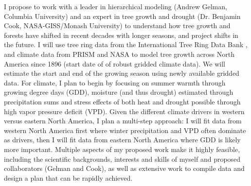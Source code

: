 \documentclass[11pt,letter,oneside]{article}
\begin{document}
I propose to work with a leader in hierarchical modeling (Andrew Gelman, Columbia University) and an expert in tree growth and drought (Dr. Benjamin Cook, NASA-GISS/Monash University) to understand how tree growth and forests have shifted in recent decades with longer seasons, and project shifts in the future. I will use tree ring data from the International Tree Ring Data Bank \cite{zhao2019international}, and climate data from PRISM and NASA to model tree growth across North America since 1896 (start date of of robust gridded climate data). We will estimate the start and end of the growing season using newly available gridded data.\cite{nelson2024x} For climate, I plan to begin by focusing on summer warmth through growing degree days (GDD), moisture (and thus drought) estimated through precipitation sums and stress effects of both heat and drought possible through high vapor pressure deficit (VPD). Given the different climate drivers in western versus eastern North America, I plan a multi-step approach: I will fit data from western North America first where winter precipitation and VPD often dominate as drivers, then I will fit data from eastern North America where GDD is likely more important. Multiple aspects of my proposed work make it highly feasible, including the scientific backgrounds, interests and skills of myself and proposed collaborators (Gelman and Cook), as well as extensive work to compile data and design a plan that can be rapidly achieved. %
\end{document}

